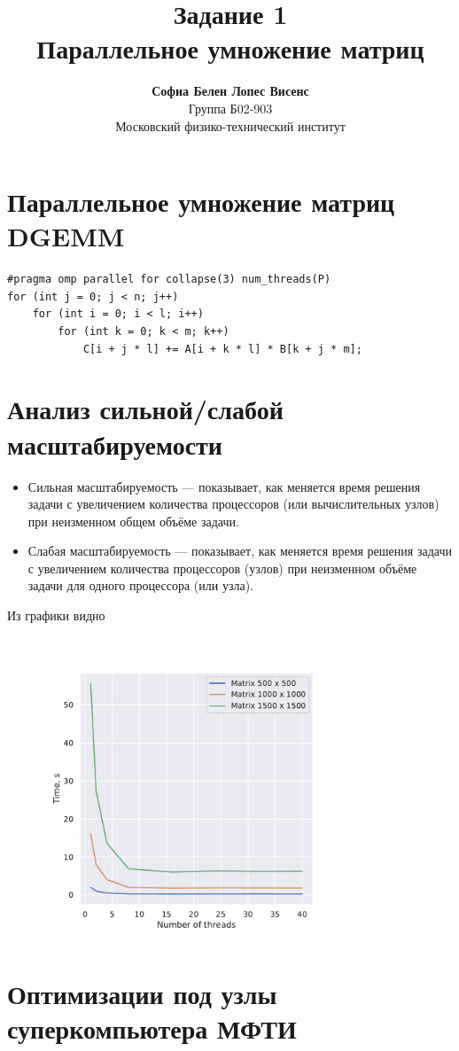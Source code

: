 \documentclass[a4paper,12pt]{article}
\author{\textbf{Софиа Белен Лопес Висенс}\\
Группа Б02-903\\
\large Московский физико-технический институт}
\title{\textbf{Задание 1}\\
Параллельное умножение матриц}
\date{}
\begin{document}
\maketitle
\newpage

\section{Параллельное умножение матриц DGEMM}

\begin{verbatim}
#pragma omp parallel for collapse(3) num_threads(P)
for (int j = 0; j < n; j++)
    for (int i = 0; i < l; i++)
        for (int k = 0; k < m; k++)
            C[i + j * l] += A[i + k * l] * B[k + j * m];
\end{verbatim}

\section{Анализ сильной/слабой масштабируемости}

\begin{itemize}
    \item Сильная масштабируемость — показывает, как меняется время решения задачи с увеличением количества процессоров (или вычислительных узлов) при неизменном общем объёме задачи.

\item Слабая масштабируемость — показывает, как меняется время решения задачи с увеличением количества процессоров (узлов) при неизменном объёме задачи для одного процессора (или узла).
\end{itemize}

Из графики видно 

\begin{figure}[H]
    \centering
    \includegraphics[width=0.8\textwidth]{../img/graph1.pdf}
    \label{fig:-img-graph1-pdf}
\end{figure}

\section{Оптимизации под узлы суперкомпьютера МФТИ}
\end{document}

